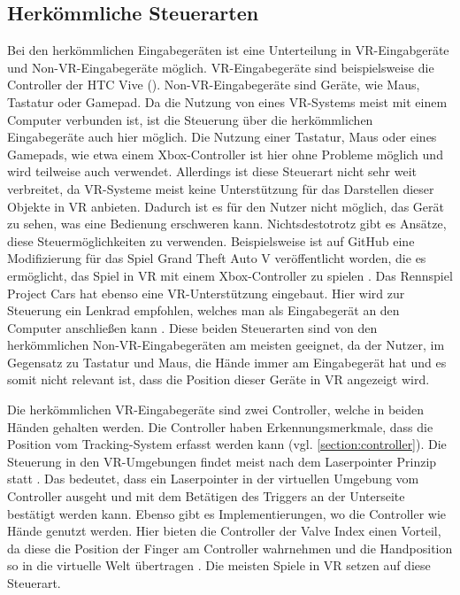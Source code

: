 \subsection{Herkömmliche Steuerarten}
Bei den herkömmlichen Eingabegeräten ist eine Unterteilung in VR-Eingabgeräte und Non-VR-Eingabegeräte möglich. VR-Eingabegeräte sind beispielsweise die Controller der HTC Vive (). Non-VR-Eingabegeräte sind Geräte, wie Maus, Tastatur oder Gamepad.
Da die Nutzung von eines VR-Systems meist mit einem Computer verbunden ist, ist die Steuerung über die herkömmlichen Eingabegeräte auch hier möglich. Die Nutzung einer Tastatur, Maus oder eines Gamepads, wie etwa einem Xbox-Controller ist hier ohne Probleme möglich und wird teilweise auch verwendet. Allerdings ist diese Steuerart nicht sehr weit verbreitet, da VR-Systeme meist keine Unterstützung für das Darstellen dieser Objekte in VR anbieten. Dadurch ist es für den Nutzer nicht möglich, das Gerät zu sehen, was eine Bedienung erschweren kann. Nichtsdestotrotz gibt es Ansätze, diese Steuermöglichkeiten zu verwenden. Beispielsweise ist auf GitHub eine Modifizierung für das Spiel Grand Theft Auto V veröffentlicht worden, die es ermöglicht, das Spiel in VR mit einem Xbox-Controller zu spielen \cite{Werner.2020}. Das Rennspiel Project Cars hat ebenso eine VR-Unterstützung eingebaut. Hier wird zur Steuerung ein Lenkrad empfohlen, welches man als Eingabegerät an den Computer anschließen kann \cite{projCars}. Diese beiden Steuerarten sind von den herkömmlichen Non-VR-Eingabegeräten am meisten geeignet, da der Nutzer, im Gegensatz zu Tastatur und Maus, die Hände immer am Eingabegerät hat und es somit nicht relevant ist, dass die Position dieser Geräte in VR angezeigt wird.

Die herkömmlichen VR-Eingabegeräte sind zwei Controller, welche in beiden Händen gehalten werden. Die Controller haben Erkennungsmerkmale, dass die Position vom Tracking-System erfasst werden kann (vgl. \autoref{section:controller}). Die Steuerung in den VR-Umgebungen findet meist nach dem Laserpointer Prinzip statt . Das bedeutet, dass ein Laserpointer in der virtuellen Umgebung vom Controller ausgeht und mit dem Betätigen des Triggers an der Unterseite bestätigt werden kann. Ebenso gibt es Implementierungen, wo die Controller wie Hände genutzt werden. Hier bieten die Controller der Valve Index einen Vorteil, da diese die Position der Finger am Controller wahrnehmen und die Handposition so in die virtuelle Welt übertragen \cite{Index.Controller}. Die meisten Spiele in VR setzen auf diese Steuerart.

